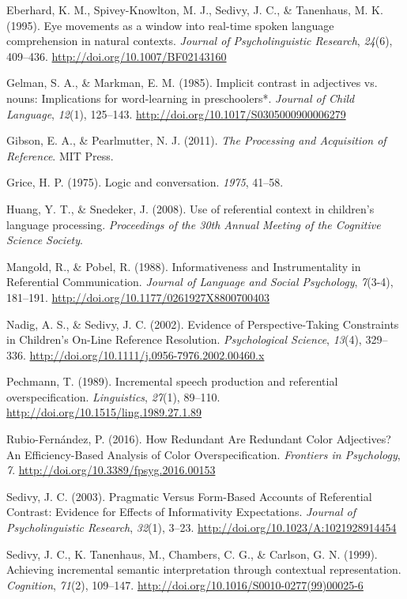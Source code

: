 \documentclass[10pt, letterpaper]{article}
\begin{document}
\hypertarget{ref-eberhard_eye_1995}{}
Eberhard, K. M., Spivey-Knowlton, M. J., Sedivy, J. C., \& Tanenhaus, M.
K. (1995). Eye movements as a window into real-time spoken language
comprehension in natural contexts. \emph{Journal of Psycholinguistic
Research}, \emph{24}(6), 409--436.
\url{http://doi.org/10.1007/BF02143160}

\hypertarget{ref-gelman_implicit_1985}{}
Gelman, S. A., \& Markman, E. M. (1985). Implicit contrast in adjectives
vs. nouns: Implications for word-learning in preschoolers*.
\emph{Journal of Child Language}, \emph{12}(1), 125--143.
\url{http://doi.org/10.1017/S0305000900006279}

\hypertarget{ref-gibson_processing_2011}{}
Gibson, E. A., \& Pearlmutter, N. J. (2011). \emph{The Processing and
Acquisition of Reference}. MIT Press.

\hypertarget{ref-grice1975logic}{}
Grice, H. P. (1975). Logic and conversation. \emph{1975}, 41--58.

\hypertarget{ref-huangsnedeker2008}{}
Huang, Y. T., \& Snedeker, J. (2008). Use of referential context in
children's language processing. \emph{Proceedings of the 30th Annual
Meeting of the Cognitive Science Society}.

\hypertarget{ref-mangold_informativeness_1988}{}
Mangold, R., \& Pobel, R. (1988). Informativeness and Instrumentality in
Referential Communication. \emph{Journal of Language and Social
Psychology}, \emph{7}(3-4), 181--191.
\url{http://doi.org/10.1177/0261927X8800700403}

\hypertarget{ref-nadig_evidence_2002}{}
Nadig, A. S., \& Sedivy, J. C. (2002). Evidence of Perspective-Taking
Constraints in Children's On-Line Reference Resolution.
\emph{Psychological Science}, \emph{13}(4), 329--336.
\url{http://doi.org/10.1111/j.0956-7976.2002.00460.x}

\hypertarget{ref-pechmann_incremental_1989}{}
Pechmann, T. (1989). Incremental speech production and referential
overspecification. \emph{Linguistics}, \emph{27}(1), 89--110.
\url{http://doi.org/10.1515/ling.1989.27.1.89}

\hypertarget{ref-rubio-fernandez_how_2016}{}
Rubio-Fernández, P. (2016). How Redundant Are Redundant Color
Adjectives? An Efficiency-Based Analysis of Color Overspecification.
\emph{Frontiers in Psychology}, \emph{7}.
\url{http://doi.org/10.3389/fpsyg.2016.00153}

\hypertarget{ref-sedivy_pragmatic_2003-2}{}
Sedivy, J. C. (2003). Pragmatic Versus Form-Based Accounts of
Referential Contrast: Evidence for Effects of Informativity
Expectations. \emph{Journal of Psycholinguistic Research}, \emph{32}(1),
3--23. \url{http://doi.org/10.1023/A:1021928914454}

\hypertarget{ref-sedivy_achieving_1999}{}
Sedivy, J. C., K. Tanenhaus, M., Chambers, C. G., \& Carlson, G. N.
(1999). Achieving incremental semantic interpretation through contextual
representation. \emph{Cognition}, \emph{71}(2), 109--147.
\url{http://doi.org/10.1016/S0010-0277(99)00025-6}


\end{document}
